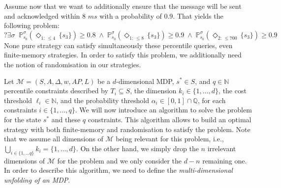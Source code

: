 \begin{example}
Assume now that we want to additionally ensure that the message will be sent and acknowledged within $8$ $ms$ with a probability of $0.9$.
That yields the following \SSPPQ{} problem:
\[
  ?\exists \sigma \;\; \mathbb{P}^{\sigma}_{s_0}(\Diamond_{1: \, \leq 4} \, \{s_3\}) \geq 0.8 \; \wedge \;
   \mathbb{P}^{\sigma}_{s_0}(\Diamond_{1: \, \leq 8} \, \{s_3\}) \geq 0.9 \; \wedge \;
  \mathbb{P}_{s_0}^{\sigma}(\Diamond_{2: \, \leq 700} \, \{s_3\}) \geq 0.9
\]
None pure strategy can satisfy simultaneously these percentile queries, even finite-memory strategies.
In order to satisfy this \SSPPQ{} problem, we additionally need the notion of randomisation in our strategies.
\end{example}

Let $\mathcal{M}=(S, A, \Delta, w, AP, L)$ be a $d$-dimensional MDP,
$s^* \in S$, and $q \in \mathbb{N}$ percentile constraints described by
$T_i \subseteq S$, the dimension $k_i \in \{1, \dots, d\}$, the cost threshold $\ell_i \in \mathbb{N}$, and the probability threshold $\alpha_i \in [0, 1] \cap \mathbb{Q}$, for each constraints $i \in \{1, \dots, q\}$.
We will now introduce an algorithm to solve the \SSPPQ{} problem for the state $s^*$ and these $q$ constraints. This algorithm allows to build an optimal strategy with both finite-memory and randomisation to satisfy the problem.
Note that we assume all dimensions of $\mathcal{M}$ being relevant for this problem, i.e., $\bigcup_{i \in \{1, \dots q\}} k_i = \{1, \dots, d\}$.
On the other hand, we simply drop the $n$ irrelevant dimensions of $\mathcal{M}$ for the problem and we only consider the $d-n$ remaining one.
In order to describe this algorithm, we need to define the \textit{multi-dimensional unfolding of an MDP}.

